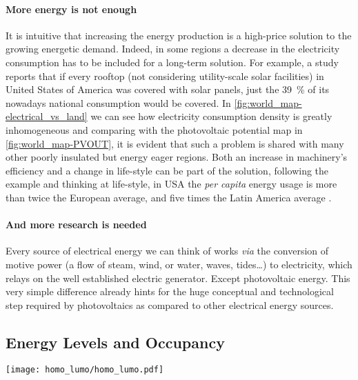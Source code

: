 	\paragraph{More energy is not enough} It is intuitive that increasing the energy production is a high-price solution to the growing energetic demand.
	Indeed, in some regions a decrease in the electricity consumption has to be included for a long-term solution.
	For example, a study \cite{Margolis2016} reports that if every rooftop (not considering utility-scale solar facilities) in United States of America was covered with solar panels, just the 39~\% of its nowadays national consumption would be covered.
	In \cref{fig:world_map-electrical_vs_land} we can see how electricity consumption density is greatly inhomogeneous and comparing with the photovoltaic potential map in \cref{fig:world_map-PVOUT}, it is evident that such a problem is shared with many other poorly insulated but energy eager regions.
	Both an increase in machinery's efficiency and a change in life-style can be part of the solution, following the example and thinking at life-style, in USA the \textsl{per capita} energy usage is more than twice the European average, and five times the Latin America average \cite{IEA}.

	\paragraph{And more research is needed} Every source of electrical energy we can think of works \textsl{via} the conversion of motive power (a flow of steam, wind, or water, waves, tides\dots) to electricity, which relays on the well established electric generator.
	Except photovoltaic energy.
	This very simple difference already hints for the huge conceptual and technological step required by photovoltaics as compared to other electrical energy sources.


	\subsection{Energy Levels and Occupancy}

		\begin{SCfigure}
			\centering
			\texttt{[image: homo\_lumo/homo\_lumo.pdf]}
			\label{fig:homo_lumo}
		\end{SCfigure}

